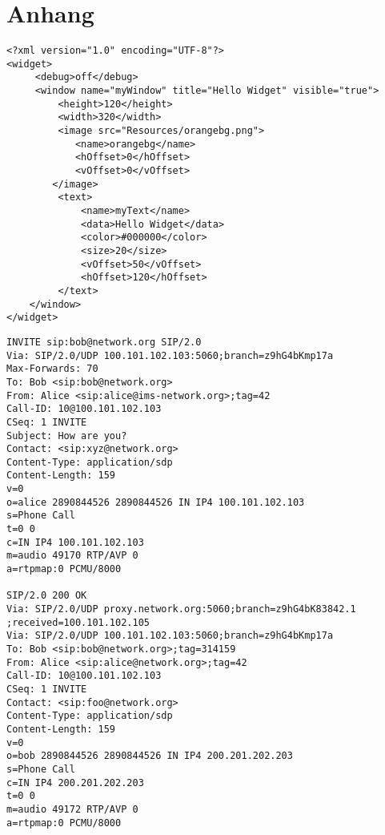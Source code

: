 \chapter*{Anhang}

\begin{appendix}

\begin{lstlisting}
<?xml version="1.0" encoding="UTF-8"?>
<widget>
	 <debug>off</debug>
	 <window name="myWindow" title="Hello Widget" visible="true">
		 <height>120</height>
		 <width>320</width>
		 <image src="Resources/orangebg.png">
			<name>orangebg</name>
			<hOffset>0</hOffset>
			<vOffset>0</vOffset>
		</image>
		 <text>
			 <name>myText</name>
			 <data>Hello Widget</data>
			 <color>#000000</color>
			 <size>20</size>
			 <vOffset>50</vOffset>
			 <hOffset>120</hOffset>
		 </text>
	</window>
</widget>
\end{lstlisting}

\newpage


\begin{lstlisting}
INVITE sip:bob@network.org SIP/2.0
Via: SIP/2.0/UDP 100.101.102.103:5060;branch=z9hG4bKmp17a
Max-Forwards: 70
To: Bob <sip:bob@network.org>
From: Alice <sip:alice@ims-network.org>;tag=42
Call-ID: 10@100.101.102.103
CSeq: 1 INVITE
Subject: How are you?
Contact: <sip:xyz@network.org>
Content-Type: application/sdp
Content-Length: 159
v=0
o=alice 2890844526 2890844526 IN IP4 100.101.102.103
s=Phone Call
t=0 0
c=IN IP4 100.101.102.103
m=audio 49170 RTP/AVP 0
a=rtpmap:0 PCMU/8000

SIP/2.0 200 OK
Via: SIP/2.0/UDP proxy.network.org:5060;branch=z9hG4bK83842.1
;received=100.101.102.105
Via: SIP/2.0/UDP 100.101.102.103:5060;branch=z9hG4bKmp17a
To: Bob <sip:bob@network.org>;tag=314159
From: Alice <sip:alice@network.org>;tag=42
Call-ID: 10@100.101.102.103
CSeq: 1 INVITE
Contact: <sip:foo@network.org>
Content-Type: application/sdp
Content-Length: 159
v=0
o=bob 2890844526 2890844526 IN IP4 200.201.202.203
s=Phone Call
c=IN IP4 200.201.202.203
t=0 0
m=audio 49172 RTP/AVP 0
a=rtpmap:0 PCMU/8000
\end{lstlisting}


\end{appendix}

\endinput
